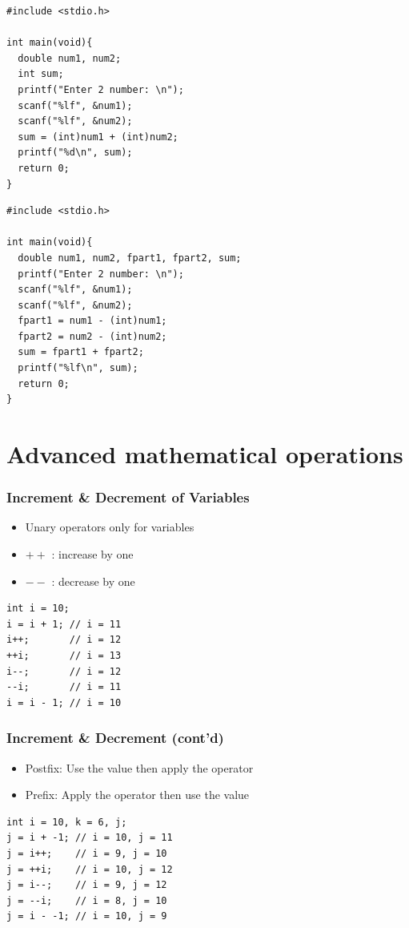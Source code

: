 \documentclass{../c-lecture}
\begin{document}
\begin{frame}[fragile]
  \begin{verbatim}
#include <stdio.h>

int main(void){
  double num1, num2;
  int sum;
  printf("Enter 2 number: \n");
  scanf("%lf", &num1);
  scanf("%lf", &num2);
  sum = (int)num1 + (int)num2;
  printf("%d\n", sum);
  return 0;
}
  \end{verbatim}
\end{frame}

\begin{frame}[fragile]
  \begin{verbatim}
#include <stdio.h>

int main(void){
  double num1, num2, fpart1, fpart2, sum;
  printf("Enter 2 number: \n");
  scanf("%lf", &num1);
  scanf("%lf", &num2);
  fpart1 = num1 - (int)num1;
  fpart2 = num2 - (int)num2;
  sum = fpart1 + fpart2;
  printf("%lf\n", sum);
  return 0;
}
  \end{verbatim}
\end{frame}

\section{Advanced mathematical operations}

\begin{frame}[fragile]
  \frametitle{Increment \& Decrement of Variables}
  \begin{itemize}
    \item Unary operators only for variables
    \item $++$ : increase by one
    \item $--$ : decrease by one
  \end{itemize}
  \begin{verbatim}
int i = 10;
i = i + 1; // i = 11
i++;       // i = 12
++i;       // i = 13
i--;       // i = 12
--i;       // i = 11
i = i - 1; // i = 10
  \end{verbatim}
\end{frame}

\begin{frame}[fragile]
  \frametitle{Increment \& Decrement (cont’d)}
  \begin{itemize}
    \item
      {\color{Cyan} Postfix:} Use the value then apply the
      operator
    \item
      {\color{Cyan} Prefix:} Apply the operator then use the value
  \end{itemize}
  \begin{verbatim}
int i = 10, k = 6, j;
j = i + -1; // i = 10, j = 11
j = i++;    // i = 9, j = 10
j = ++i;    // i = 10, j = 12
j = i--;    // i = 9, j = 12
j = --i;    // i = 8, j = 10
j = i - -1; // i = 10, j = 9
  \end{verbatim}
\end{frame}
\end{document}
